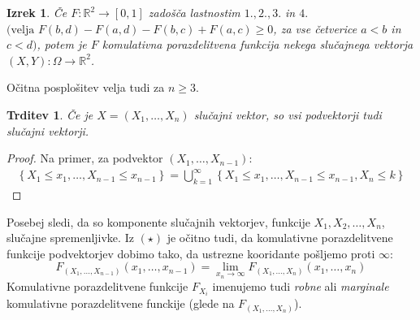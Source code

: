 \documentclass[12pt]{book}
\def\n{\noindent}
\theoremstyle{definition}
\theoremstyle{plain}
\newtheorem{izrek}{Izrek}
\theoremstyle{plain}
\newtheorem{trditev}{Trditev}
\theoremstyle{plain}
\theoremstyle{remark}
\begin{document}
\begin{izrek}
    Če $F: \mathbb{R}^2 \rightarrow[0,1]$ zadošča lastnostim $1., 2., 3.$ in $4.$ $(\text{velja } F(b, d)-F(a, d)-F(b, c)+F(a, c) \geq 0$, za vse četverice $a<b$ in $c<d)$, potem je $F$ komulativna porazdelitvena funkcija nekega slučajnega vektorja $(X,Y): \Omega \to \mathbb{R}^2$. 
\end{izrek}

\n Očitna posplošitev velja tudi za $n \geq 3$. 

\begin{trditev}
    Če je $X=\left(X_1, \ldots, X_n\right)$ slučajni vektor, so vsi podvektorji tudi slučajni vektorji.
\end{trditev}

\begin{proof}
    Na primer, za podvektor $\left(X_1, \ldots, X_{n-1}\right)$: 
    \begin{align}
        \left\{X_1 \leq x_1, \ldots, X_{n-1} \leq x_{n-1}\right\}=\bigcup_{k=1}^{\infty}\left\{X_1 \leq x_1, \ldots, X_{n-1} \leq x_{n-1}, X_n \leq k\right\} \tag{$\star$} 
    \end{align}
\end{proof}

\n Posebej sledi, da so komponente slučajnih vektorjev, funkcije $X_1, X_2, \ldots, X_n$, slučajne spremenljivke. Iz $(\star)$ je očitno tudi, da komulativne porazdelitvene funkcije podvektorjev dobimo tako, da ustrezne kooridante pošljemo proti $\infty$:
$$
F_{\left(X_1, \ldots, X_{n-1}\right)}\left(x_1, \ldots, x_{n-1}\right)=\lim _{x_n \to \infty} F_{\left(X_1, \ldots, X_n\right)}\left(x_1, \ldots, x_n\right)
$$
Komulativne porazdelitvene funkcije $F_{X_i}$ imenujemo tudi \emph{robne} ali \emph{marginale} komulativne porazdelitvene funckije (glede na $F_{(X_1, \ldots, X_n)}$). 
\end{document}
